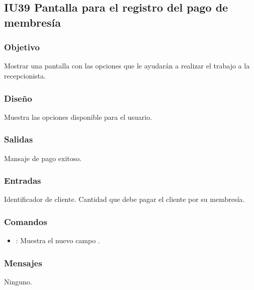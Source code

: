 \subsection{IU39 Pantalla para el registro del pago de membresía}

\subsubsection{Objetivo}
	Mostrar una pantalla con las opciones que le ayudarán a realizar el trabajo a la recepcionista.

\subsubsection{Diseño}
	Muestra las opciones disponible para el usuario.


\subsubsection{Salidas}

	Mansaje de pago exitoso.

\subsubsection{Entradas}
	Identificador de cliente. Cantidad que debe pagar el cliente por su membresía.

\subsubsection{Comandos}
\begin{itemize}
	\item {}: Muestra el nuevo campo .
\end{itemize}

\subsubsection{Mensajes}
	\begin{Citemize}
		\item Ninguno.
	\end{Citemize}